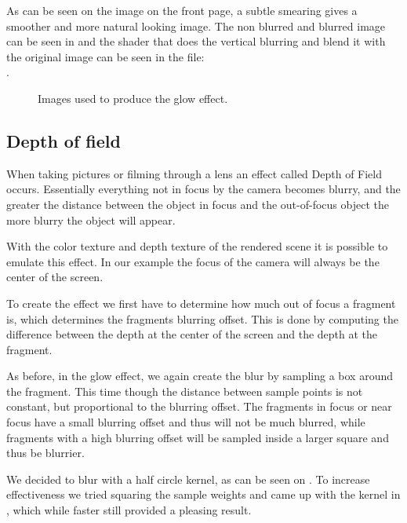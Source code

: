 As can be seen on the image on the front page, a subtle smearing gives
a smoother and more natural looking image. The non blurred and blurred
image can be seen in  and the shader that does the
vertical blurring and blend it with the original image can be seen in
the file:\\ .

\begin{figure}
  \centering
  \caption{Images used to produce the glow effect.}
  \label{fig:glow}
\end{figure}


\subsection{Depth of field}

When taking pictures or filming through a lens an effect called Depth
of Field occurs. Essentially everything not in focus by the camera
becomes blurry, and the greater the distance between the object in
focus and the out-of-focus object the more blurry the object will
appear.

With the color texture and depth texture of the rendered scene it is
possible to emulate this effect. In our example the focus of the
camera will always be the center of the screen.

To create the effect we first have to determine how much out of focus
a fragment is, which determines the fragments blurring offset. This is
done by computing the difference between the depth at the center of
the screen and the depth at the fragment.

As before, in the glow effect, we again create the blur by sampling a
box around the fragment. This time though the distance between sample
points is not constant, but proportional to the blurring offset. The
fragments in focus or near focus have a small blurring offset and thus
will not be much blurred, while fragments with a high blurring offset
will be sampled inside a larger square and thus be blurrier.

We decided to blur with a half circle kernel, as can be seen on
. To increase effectiveness we tried squaring
the sample weights and came up with the kernel in
, which while faster still provided a pleasing
result.

